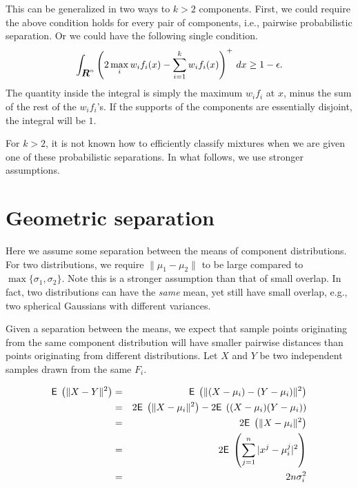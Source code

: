 \documentclass{book}
\numberwithin{exercise}{chapter}
\begin{document}
This can be generalized in two ways to $k > 2$ components. First, we could require the above condition holds for every pair of components, i.e., pairwise probabilistic separation. Or we could have the following single condition.
\begin{equation}\label{k-TV}
\int_{\mbox{\mbox{\boldmath $R$}}^n} \left(2\max_i w_if_i(x)- \sum_{i=1}^k w_if_i(x)\right)^+ \, dx \ge 1-\epsilon.
\end{equation}
The quantity inside the integral is simply the maximum $w_if_i$ at $x$,
minus the sum of the rest of the $w_if_i$'s. If the supports of the components are essentially disjoint, the integral will be $1$.

For $k > 2$, it is not known how to efficiently classify mixtures when we are given one of these probabilistic separations.  In what follows, we use stronger assumptions.

\section{Geometric separation}

Here we assume some separation between the means of component distributions.
For two distributions, we require $\|\mu_1-\mu_2\|$ to be large compared to
$\max\{\sigma_1,\sigma_2\}$.
Note this is a
stronger assumption than that of small overlap.  In fact, two
distributions can have the \emph{same} mean, yet still have small
overlap, e.g., two spherical Gaussians with different variances.


Given a separation between the means, we expect that sample points
originating from the same component distribution will have smaller
pairwise distances than points originating from different
distributions. Let $X$ and $Y$ be two independent samples drawn from the
same $F_i$.

\begin{eqnarray*}
\hbox{{\sf E}\;}\left(\|X-Y\|^2\right)  &=& \hbox{{\sf E}\;}\left(\|(X-\mu_i) - (Y-\mu_i)\|^2\right) \\
 &=& 2\hbox{{\sf E}\;}\left(\|X-\mu_i\|^2\right) - 2\hbox{{\sf E}\;}\left((X-\mu_i)(Y-\mu_i)\right) \\
 &=& 2\hbox{{\sf E}\;}\left(\|X-\mu_i\|^2\right) \\
 &=& 2\hbox{{\sf E}\;}\left(\sum_{j=1}^n |x^j-\mu_i^j|^2\right) \\
 &=& 2n\sigma_i^2 \\
\end{eqnarray*}
\end{document}
